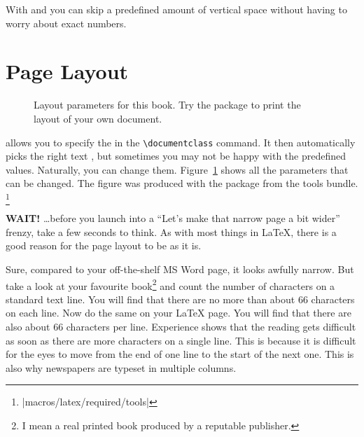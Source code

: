 With  and  you can skip a predefined amount of
vertical space without having to worry about exact numbers.


\section{Page Layout}

\begin{figure}[!hp]
\begin{center}
\makeatletter\@mylayout\makeatother
\end{center}
\vspace*{1.8cm}
\caption[Layout parameters for this book.]{Layout parameters for this book. Try the  package to print the layout of your own document.}
\label{fig:layout}
\end{figure}
\LaTeXe{} allows you to specify the  in the
\verb|\documentclass| command. It then automatically picks the right 
text , but sometimes you may not be happy with 
the predefined values. Naturally, you can change them. 
\thispagestyle{fancyplain}
Figure~\ref{fig:layout} shows all the parameters that can be changed.
The figure was produced with the  package from the tools bundle.%
\footnote{\CTANref|macros/latex/required/tools|}

\textbf{WAIT!} \ldots before you launch into a ``Let's make that
narrow page a bit wider'' frenzy, take a few seconds to think. As with
most things in \LaTeX, there is a good reason for the page layout to
be as it is.

Sure, compared to your off-the-shelf MS Word page, it looks awfully
narrow. But take a look at your favourite book\footnote{I mean a real
  printed book produced by a reputable publisher.} and count the number
of characters on a standard text line. You will find that there are no
more than about 66 characters on each line. Now do the same on your
\LaTeX{} page. You will find that there are also about 66 characters
per line.  Experience shows that the reading gets difficult as soon as
there are more characters on a single line. This is because it is
difficult for the eyes to move from the end of one line to the start of the next one.
This is also why newspapers are typeset in multiple columns.

